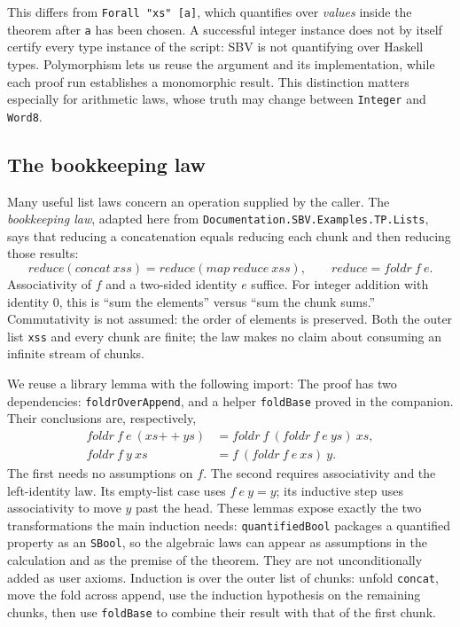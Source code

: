 \documentclass[review]{jfp-epi}
\newcommand{\code}[1]{\texttt{#1}}
\begin{document}
This differs from \code{Forall "xs" [a]}, which quantifies over \emph{values}
inside the theorem after \code{a} has been chosen. A successful integer instance
does not by itself certify every type instance of the script: SBV is not
quantifying over Haskell types. Polymorphism lets us reuse the argument and its
implementation, while each proof run establishes a monomorphic result. This
distinction matters especially for arithmetic laws, whose truth may change
between \code{Integer} and \code{Word8}.

\subsection{The bookkeeping law}

Many useful list laws concern an operation supplied by the caller. The
\emph{bookkeeping law}, adapted here from
\code{Documentation.SBV.Examples.TP.Lists}, says that reducing a concatenation
equals reducing each chunk and then reducing those results:
\[
 \mathit{reduce}(\mathit{concat}\ xss)
 = \mathit{reduce}(\mathit{map}\ \mathit{reduce}\ xss),
 \qquad \mathit{reduce}=\mathit{foldr}\ f\ e.
\]
Associativity of $f$ and a two-sided identity $e$ suffice. For integer addition
with identity 0, this is ``sum the elements'' versus ``sum the chunk sums.''
Commutativity is not assumed: the order of elements is preserved.
Both the outer list \code{xss} and every chunk are finite; the law makes no
claim about consuming an infinite stream of chunks.



We reuse a library lemma with the following import:
The proof has two dependencies: \code{foldrOverAppend}, and a helper
\code{foldBase} proved in the companion. Their conclusions are, respectively,
\[
\begin{aligned}
 \mathit{foldr}\ f\ e\ (xs \mathbin{++} ys)
   &= \mathit{foldr}\ f\ (\mathit{foldr}\ f\ e\ ys)\ xs,\\
 \mathit{foldr}\ f\ y\ xs &= f\ (\mathit{foldr}\ f\ e\ xs)\ y.
\end{aligned}
\]
The first needs no assumptions on $f$. The second requires associativity and
the left-identity law. Its empty-list case uses
$f\ e\ y=y$; its inductive step uses associativity to move $y$ past the head.
These lemmas expose exactly the two transformations the main induction needs:
\code{quantifiedBool} packages a quantified property as an \code{SBool}, so the
algebraic laws can appear as assumptions in the calculation and as the premise
of the theorem. They are not unconditionally added as user axioms. Induction
is over the outer list of chunks: unfold \code{concat}, move the fold across
append, use the induction hypothesis on the remaining chunks, then use
\code{foldBase} to combine their result with that of the first chunk.
\end{document}
